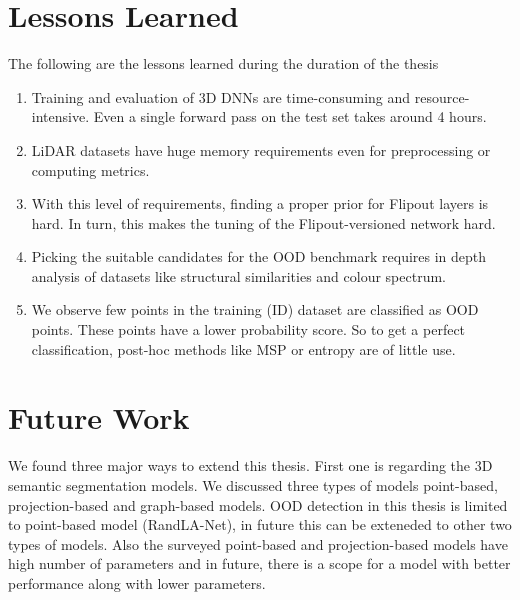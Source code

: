     \section{Lessons Learned}
    The following are the lessons learned during the duration of the thesis
    \begin{enumerate}
        \item Training and evaluation of 3D DNNs are time-consuming and resource-intensive. Even a single forward pass on the test set takes around 4 hours.
        \item LiDAR datasets have huge memory requirements even for preprocessing or computing metrics.
        \item With this level of requirements, finding a proper prior for Flipout layers is hard. In turn, this makes the tuning of the Flipout-versioned network hard.
        \item Picking the suitable candidates for the OOD benchmark requires in depth analysis of datasets like structural similarities and colour spectrum.
        \item We observe few points in the training (ID) dataset are classified as OOD points. These points have a lower probability score. So to get a perfect classification, post-hoc methods like MSP or entropy are of little use.
    \end{enumerate}

    \section{Future Work}
    
    We found three major ways to extend this thesis. 
    First one is regarding the 3D semantic segmentation models.
    We discussed three types of models point-based, projection-based and graph-based models.
    OOD detection in this thesis is limited to point-based model (RandLA-Net), in future this can be exteneded to other two types of models.
    Also the surveyed point-based and projection-based models have high number of parameters and in future, there is a scope for a model with better performance along with lower parameters.

